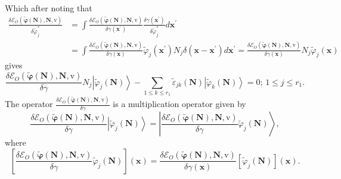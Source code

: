 \documentclass[aps,preprint]{revtex4}%
\begin{document}
Which after noting that
\begin{align}
\frac{\delta\mathcal{E}_{O}\left(  \boldsymbol{\tilde{\varphi}}\left(
\boldsymbol{N}\right)  ,\boldsymbol{N,}\mathrm{v}\right)  }{\delta
\tilde{\varphi}_{j}^{\ast}}  &  =\int\frac{\delta\mathcal{E}_{O}\left(
\boldsymbol{\tilde{\varphi}}\left(  \boldsymbol{N}\right)  ,\boldsymbol{N,}%
\mathrm{v}\right)  }{\delta\gamma\left(  \boldsymbol{x}^{\prime}\right)
}\frac{\delta\gamma\left(  \boldsymbol{x}^{\prime}\right)  }{\delta
\tilde{\varphi}_{j}^{\ast}}d\boldsymbol{x}^{\prime}\nonumber\\
&  =\int\frac{\delta\mathcal{E}_{O}\left(  \boldsymbol{\tilde{\varphi}}\left(
\boldsymbol{N}\right)  ,\boldsymbol{N,}\mathrm{v}\right)  }{\delta
\gamma\left(  \boldsymbol{x}\right)  }\tilde{\varphi}_{j}\left(
\boldsymbol{x}^{\prime}\right)  N_{j}\delta\left(  \boldsymbol{x-x}^{\prime
}\right)  d\boldsymbol{x}^{\prime}=\frac{\delta\mathcal{E}_{O}\left(
\boldsymbol{\tilde{\varphi}}\left(  \boldsymbol{N}\right)  ,\boldsymbol{N,}%
\mathrm{v}\right)  }{\delta\gamma\left(  \boldsymbol{x}\right)  }N_{j}%
\tilde{\varphi}_{j}\left(  \boldsymbol{x}\right)
\end{align}
gives%
\begin{equation}
\frac{\delta\mathcal{E}_{O}\left(  \boldsymbol{\tilde{\varphi}}\left(
\boldsymbol{N}\right)  ,\boldsymbol{N,}\mathrm{v}\right)  }{\delta\gamma}%
N_{j}\left\vert \tilde{\varphi}_{j}\left(  \boldsymbol{N}\right)
\right\rangle -\sum_{1\leq k\leq r_{1}}\tilde{\varepsilon}_{jk}\left(
\boldsymbol{N}\right)  \left\vert \tilde{\varphi}_{k}\left(  \boldsymbol{N}%
\right)  \right\rangle =0;\,1\leq j\leq r_{1}.
\end{equation}
The operator $\frac{\delta\mathcal{E}_{O}\left(  \boldsymbol{\tilde{\varphi}%
}\left(  \boldsymbol{N}\right)  ,\boldsymbol{N,}\mathrm{v}\right)  }%
{\delta\gamma}$ is a multiplication operator given by
\begin{equation}
\frac{\delta\mathcal{E}_{O}\left(  \boldsymbol{\tilde{\varphi}}\left(
\boldsymbol{N}\right)  ,\boldsymbol{N,}\mathrm{v}\right)  }{\delta\gamma
}\left\vert \tilde{\varphi}_{j}\left(  \boldsymbol{N}\right)  \right\rangle
=\left\vert \frac{\delta\mathcal{E}_{O}\left(  \boldsymbol{\tilde{\varphi}%
}\left(  \boldsymbol{N}\right)  ,\boldsymbol{N,}\mathrm{v}\right)  }%
{\delta\gamma}\tilde{\varphi}_{j}\left(  \boldsymbol{N}\right)  \right\rangle
,
\end{equation}
where
\begin{equation}
\left[  \frac{\delta\mathcal{E}_{O}\left(  \boldsymbol{\tilde{\varphi}}\left(
\boldsymbol{N}\right)  ,\boldsymbol{N,}\mathrm{v}\right)  }{\delta\gamma
}\tilde{\varphi}_{j}\left(  \boldsymbol{N}\right)  \right]  \left(
\boldsymbol{x}\right)  =\frac{\delta\mathcal{E}_{O}\left(  \boldsymbol{\tilde
{\varphi}}\left(  \boldsymbol{N}\right)  ,\boldsymbol{N,}\mathrm{v}\right)
}{\delta\gamma\left(  \boldsymbol{x}\right)  }\left[  \tilde{\varphi}%
_{j}\left(  \boldsymbol{N}\right)  \right]  \left(  \boldsymbol{x}\right)  .
\end{equation}
\end{document}
